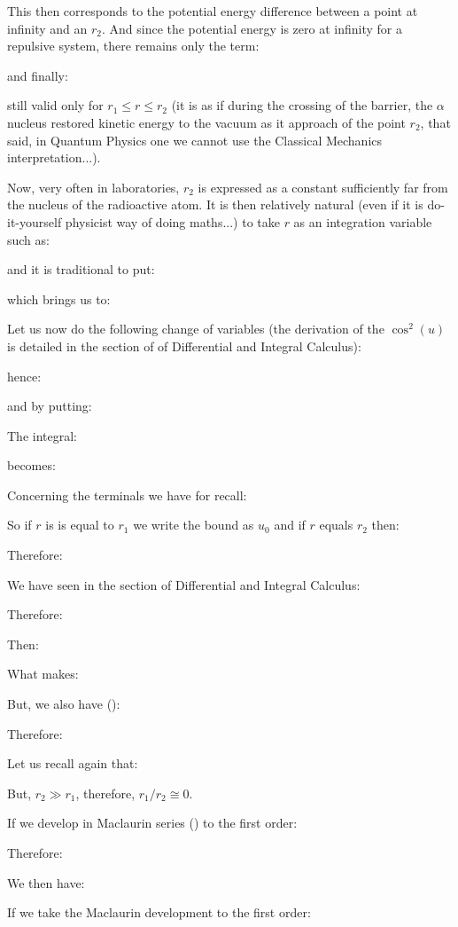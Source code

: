 	This then corresponds to the potential energy difference between a point at infinity and an $r_2$. And since the potential energy is zero at infinity for a repulsive system, there remains only the term:
	
	and finally:
	
	still valid only for $r_1\le r \le r_2$ (it is as if during the crossing of the barrier, the $\alpha$nucleus restored kinetic energy to the vacuum as it approach of the point $r_2$, that said, in Quantum Physics one we cannot use the Classical Mechanics interpretation...).

	Now, very often in laboratories, $r_2$ is expressed as a constant sufficiently far from the nucleus of the radioactive atom. It is then relatively natural (even if it is do-it-yourself physicist way of doing maths...) to take $r$ as an integration variable such as:
	
	and it is traditional to put:
	
	which brings us to:
	
	Let us now do the following change of variables (the derivation of the $\cos^2(u)$ is detailed in the section of of Differential and Integral Calculus):
	
	hence:
	
	and by putting:
	
	The integral:
	
	becomes:
	
	Concerning the terminals we have for recall:
	
	So if $r$ is is equal to $r_1$ we write the bound as $u_0$ and if $r$ equals $r_2$ then:
	
	Therefore:
	
	We have seen in the section of Differential and Integral Calculus:
	
	Therefore:
	
	Then:
	
	What makes:
	
	But, we also have ():
	
	Therefore:
	
	Let us recall again that:
	
	But, $r_2 \gg r_1$, therefore, $r_1/r_2\cong 0$.
	
	If we develop in Maclaurin series () to the first order:
	
	Therefore:
	
	We then have:
	
	If we take the Maclaurin development to the first order:
	
